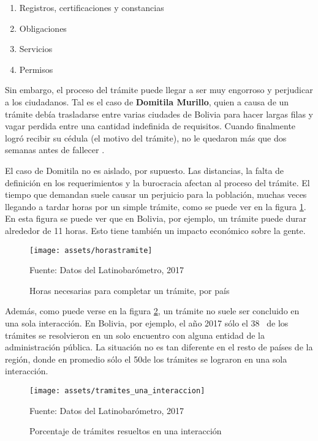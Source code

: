 \begin{enumerate}
    \item Registros, certificaciones y constancias
    \item Obligaciones
    \item Servicios
    \item Permisos
\end{enumerate}

Sin embargo, el proceso del trámite puede llegar a ser muy engorroso y perjudicar a los ciudadanos.
Tal es el caso de \textbf{Domitila Murillo}, quien a causa de un trámite debía trasladarse entre varias ciudades de Bolivia para hacer largas filas y vagar perdida entre una cantidad indefinida de requisitos.
Cuando finalmente logró recibir su cédula (el motivo del trámite), no le quedaron más que dos semanas antes de fallecer \cite{charoskyQuejaComoEnergia2014}.

El caso de Domitila no es aislado, por supuesto.
Las distancias, la falta de definición en los requerimientos y la burocracia afectan al proceso del trámite.
El tiempo que demandan suele causar un perjuicio para la población, muchas veces llegando a tardar horas por un simple trámite, como se puede ver en la figura \ref{fig:horastramite}.
En esta figura se puede ver que en Bolivia, por ejemplo, un trámite puede durar alrededor de 11 horas. Esto tiene también un impacto económico sobre la gente.

\begin{figure}[htbp]
    \centering
    \texttt{[image: assets/horastramite]}
    \caption{Horas necesarias para completar un trámite, por país}{Fuente: Datos del Latinobarómetro, 2017}
    \label{fig:horastramite}
\end{figure}

Además, como puede verse en la figura \ref{fig:tramites_una_interaccion}, un trámite no suele ser concluido en una sola interacción.
En Bolivia, por ejemplo, el año 2017 sólo el 38\percentsign ~ de los trámites se resolvieron en un solo encuentro con alguna entidad de la administración pública.
La situación no es tan diferente en el resto de países de la región, donde en promedio sólo el 50\percentsign de los trámites se lograron en una sola interacción.

\begin{figure}
    \centering
    \texttt{[image: assets/tramites\_una\_interaccion]}
    \caption{Porcentaje de trámites resueltos en una interacción}{Fuente: Datos del Latinobarómetro, 2017}
    \label{fig:tramites_una_interaccion}
\end{figure}

